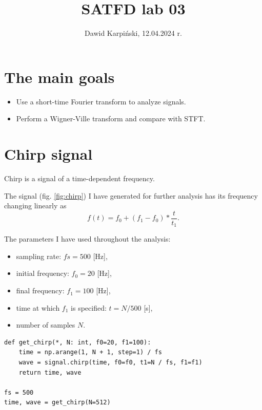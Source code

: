 \documentclass[13pt,a4paper]{article}
\begin{document}
\title{
    \LARGE
    \textbf{SATFD lab 03}
}
\author{
    \large
    Dawid Karpiński, 12.04.2024 r.
}
\date{}
\maketitle

\section{The main goals}

\begin{itemize}
    \item Use a short-time Fourier transform to analyze signals.
    \item Perform a Wigner-Ville transform and compare with STFT.
\end{itemize}


\section{Chirp signal}

Chirp is a signal of a time-dependent frequency.

The signal (fig. \ref{fig:chirp}) I have generated for further analysis has its frequency changing linearly \cite{scipychirp} as
$$
f(t) = f_0 + (f_1 - f_0) * \frac{t}{t_1}.
$$

The parameters I have used throughout the analysis:
\begin{itemize}
    \item sampling rate: $fs=500$ [Hz],
    \item initial frequency: $f_0=20$ [Hz],
    \item final frequency: $f_1=100$ [Hz],
    \item time at which $f_1$ is specified: $t=N / 500$ [s],
    \item number of samples $N$.
\end{itemize}

\pagebreak

\begin{lstlisting}[caption={\textbf{Snippet with a custom function to generate the chirp signal with given parameters.}}]
def get_chirp(*, N: int, f0=20, f1=100):
    time = np.arange(1, N + 1, step=1) / fs
    wave = signal.chirp(time, f0=f0, t1=N / fs, f1=f1)
    return time, wave

fs = 500
time, wave = get_chirp(N=512)
\end{lstlisting}
\end{document}
